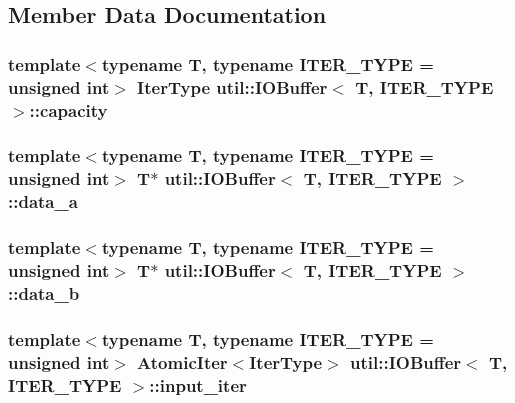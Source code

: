 \subsection{Member Data Documentation}
\hypertarget{structutil_1_1IOBuffer_a006eed5dd94ffd328f9a8807828d0ea3}{
\subsubsection[{capacity}]{\setlength{\rightskip}{0pt plus 5cm}template$<$typename T, typename I\-T\-E\-R\-\_\-\-T\-Y\-P\-E = unsigned int$>$ {\bf Iter\-Type} {\bf util\-::\-I\-O\-Buffer}$<$ T, I\-T\-E\-R\-\_\-\-T\-Y\-P\-E $>$\-::capacity}}\label{structutil_1_1IOBuffer_a006eed5dd94ffd328f9a8807828d0ea3}
\hypertarget{structutil_1_1IOBuffer_a04da979c2cb6738e4a93d3f8bc94e4e3}{
\subsubsection[{data\-\_\-a}]{\setlength{\rightskip}{0pt plus 5cm}template$<$typename T, typename I\-T\-E\-R\-\_\-\-T\-Y\-P\-E = unsigned int$>$ T$\ast$ {\bf util\-::\-I\-O\-Buffer}$<$ T, I\-T\-E\-R\-\_\-\-T\-Y\-P\-E $>$\-::data\-\_\-a}}\label{structutil_1_1IOBuffer_a04da979c2cb6738e4a93d3f8bc94e4e3}
\hypertarget{structutil_1_1IOBuffer_a8318163d07c67fb688fcf34b67aff3ce}{
\subsubsection[{data\-\_\-b}]{\setlength{\rightskip}{0pt plus 5cm}template$<$typename T, typename I\-T\-E\-R\-\_\-\-T\-Y\-P\-E = unsigned int$>$ T$\ast$ {\bf util\-::\-I\-O\-Buffer}$<$ T, I\-T\-E\-R\-\_\-\-T\-Y\-P\-E $>$\-::data\-\_\-b}}\label{structutil_1_1IOBuffer_a8318163d07c67fb688fcf34b67aff3ce}
\hypertarget{structutil_1_1IOBuffer_a99b1d8e0089db4b9d29aaffdbf49948b}{
\subsubsection[{input\-\_\-iter}]{\setlength{\rightskip}{0pt plus 5cm}template$<$typename T, typename I\-T\-E\-R\-\_\-\-T\-Y\-P\-E = unsigned int$>$ {\bf Atomic\-Iter}$<${\bf Iter\-Type}$>$ {\bf util\-::\-I\-O\-Buffer}$<$ T, I\-T\-E\-R\-\_\-\-T\-Y\-P\-E $>$\-::input\-\_\-iter}}\label{structutil_1_1IOBuffer_a99b1d8e0089db4b9d29aaffdbf49948b}
